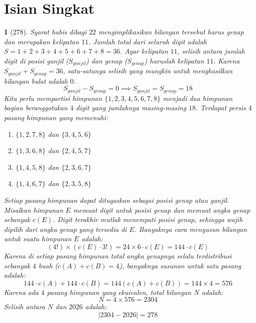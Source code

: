 \documentclass[11pt,a4paper,DIV=12]{scrartcl}
\theoremstyle{problemstyle}
\theoremstyle{answerstyle}
\newtheorem{answer}{}
\begin{document}
\section*{Isian Singkat}
\begin{answer}[278]
  Syarat habis dibagi $22$ mengimplikasikan bilangan tersebut harus genap dan merupakan kelipatan $11$.
  Jumlah total dari seluruh digit adalah $S = 1+2+3+4+5+6+7+8 = 36$. Agar kelipatan $11$, selisih antara jumlah digit di posisi ganjil ($S_{ganjil}$) dan genap ($S_{genap}$) haruslah kelipatan $11$. Karena $S_{ganjil} + S_{genap} = 36$, satu-satunya selisih yang mungkin untuk menghasilkan bilangan bulat adalah $0$.
  $$ S_{ganjil} - S_{genap} = 0 \implies S_{ganjil} = S_{genap} = 18 $$
  Kita perlu mempartisi himpunan $\{1, 2, 3, 4, 5, 6, 7, 8\}$ menjadi dua himpunan bagian beranggotakan $4$ digit yang jumlahnya masing-masing $18$. Terdapat persis $4$ pasang himpunan yang memenuhi:
  \begin{enumerate}
    \item $\{1, 2, 7, 8\}$ dan $\{3, 4, 5, 6\}$
    \item $\{1, 3, 6, 8\}$ dan $\{2, 4, 5, 7\}$
    \item $\{1, 4, 5, 8\}$ dan $\{2, 3, 6, 7\}$
    \item $\{1, 4, 6, 7\}$ dan $\{2, 3, 5, 8\}$
  \end{enumerate}
  Setiap pasang himpunan dapat ditugaskan sebagai posisi genap atau ganjil. Misalkan himpunan $E$ memuat digit untuk posisi genap dan memuat angka genap sebanyak $c(E)$. Digit terakhir mutlak menempati posisi genap, sehingga wajib dipilih dari angka genap yang tersedia di $E$. Banyaknya cara menyusun bilangan untuk suatu himpunan $E$ adalah:
  $$ (4!) \times \left( c(E) \cdot 3! \right) = 24 \times 6 \cdot c(E) = 144 \cdot c(E) $$
  Karena di setiap pasang himpunan total angka genapnya selalu terdistribusi sebanyak $4$ buah ($c(A) + c(B) = 4$), banyaknya susunan untuk satu pasang adalah:
  $$ 144 \cdot c(A) + 144 \cdot c(B) = 144 (c(A) + c(B)) = 144 \times 4 = 576 $$
  Karena ada $4$ pasang himpunan yang ekuivalen, total bilangan $N$ adalah:
  $$ N = 4 \times 576 = 2304 $$
  Selisih antara $N$ dan $2026$ adalah:
  $$ |2304 - 2026| = \boxed{278} $$
\end{answer}
\end{document}
